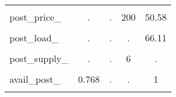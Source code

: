 \begin{table}[htbp]
\begin{tabular}{l*{4}{c}}
                &         &         &         &         \\
\addlinespace
post\_price\_     &        .&        .&      200&    50.58\\
                &         &         &         &         \\
\addlinespace
post\_load\_      &        .&        .&        .&    66.11\\
                &         &         &         &         \\
\addlinespace
post\_supply\_    &        .&        .&        6&        .\\
                &         &         &         &         \\
\addlinespace
avail\_post\_     &    0.768&        .&        .&        1\\
                &         &         &         &         \\
\bottomrule
\end{tabular}
\end{table}
